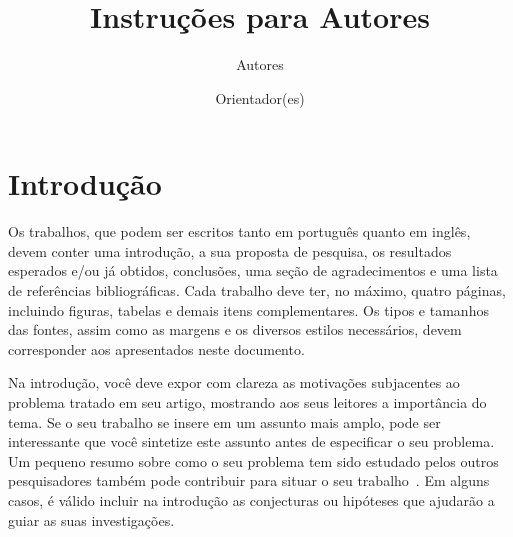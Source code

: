 \documentclass[11pt]{article}
\title{Instruções para Autores}
\author{Autores \and Orientador(es)}
\begin{document}
\hyphenation{}
\pagestyle{fancy}


  \section{Introdução}
  \label{sec:introducao}

   Os trabalhos, que podem ser escritos tanto em português quanto em
   inglês, devem conter uma introdução, a sua proposta de
   pesquisa, os resultados esperados e/ou já obtidos, conclusões, uma seção
   de agradecimentos e uma lista de referências bibliográficas. Cada trabalho
   deve ter, no máximo, quatro páginas, incluindo figuras, tabelas e demais 
   itens complementares. Os tipos e tamanhos das fontes, assim como as
   margens e os diversos estilos necessários, devem corresponder aos
   apresentados neste documento.

   Na introdução, você deve expor com clareza as motivações
   subjacentes ao problema tratado em seu artigo, mostrando aos seus
   leitores a importância do tema. Se o seu trabalho se insere em um
   assunto mais amplo, pode ser interessante que você sintetize este
   assunto antes de especificar o seu problema. Um pequeno resumo
   sobre como o seu problema tem sido estudado pelos outros
   pesquisadores também pode contribuir para situar o seu
   trabalho~\cite{Blinn87}. Em alguns casos, é válido incluir na
   introdução as conjecturas ou hipóteses que ajudarão a guiar as
   suas investigações.
\end{document}
